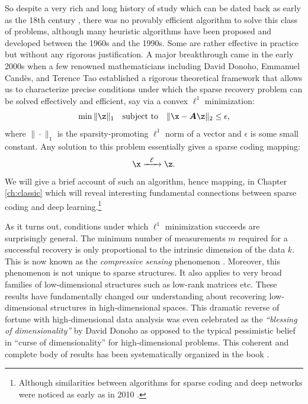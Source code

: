 \documentclass[../../book-main.tex]{subfiles}
\begin{document}
So despite a very rich and long history of study which can be dated back as early as  the 18th century \cite{Boscovichca1750}, there was no provably efficient algorithm to solve this class of problems, although many heuristic algorithms have been proposed and developed between the 1960s and the 1990s. Some are rather effective in practice but without any rigorous justification. A major breakthrough came in the early 2000s when a few renowned mathematicians including David Donoho, Emmanuel Cand\`{e}s, and Terence Tao \cite{donoho2005neighborly,Candes2005,CandesE2005-IT} established a rigorous theoretical framework that allows us to characterize  precise conditions under which the sparse recovery problem can be solved effectively and efficient, say via a convex $\ell^1$ minimization:
\begin{equation}
    \min \|\z\|_1 \quad \mbox{subject to} \quad \| \x - \boldsymbol{A}\z\|_2 \le \epsilon,
\end{equation}
where $\|\cdot \|_1$ is the sparsity-promoting $\ell^1$ norm of a vector and $\epsilon$ is some small constant. Any solution to this problem essentially gives a sparse coding mapping:
\begin{equation}
    \x   \xrightarrow{\hspace{2mm} \mathcal{E} \hspace{2mm}}  \z.
       \label{eqn:decoding-sparse}
\end{equation}
We will give a brief account of such an algorithm, hence mapping, in Chapter \ref{ch:classic} which will reveal interesting fundamental connections between sparse coding and deep learning.\footnote{Although similarities between algorithms for sparse coding and deep networks were noticed as early as in 2010 \cite{gregor2010learning}.}

As it turns out, conditions under which $\ell^1$ minimization succeeds are surprisingly general. The minimum number of measurements $m$ required for a successful recovery is only proportional to the intrinsic dimension of the data $k$. This is now known as the {\em compressive sensing} phenomenon \cite{CandesE2006-ICM}. Moreover, this phenomenon is not unique to sparse structures. It also applies to very broad families of low-dimensional structures such as low-rank matrices etc. These results have fundamentally changed our understanding about recovering low-dimensional structures in high-dimensional spaces. This dramatic reverse of fortune with high-dimensional data analysis was even celebrated as the {\em ``blessing of dimensionality''} by David Donoho \cite{DonohoD2000} as opposed to the typical pessimistic belief in  ``curse of dimensionality'' for high-dimensional problems. This coherent and complete body of results has  been systematically organized in the book \cite{Wright-Ma-2022}. 
\end{document}
